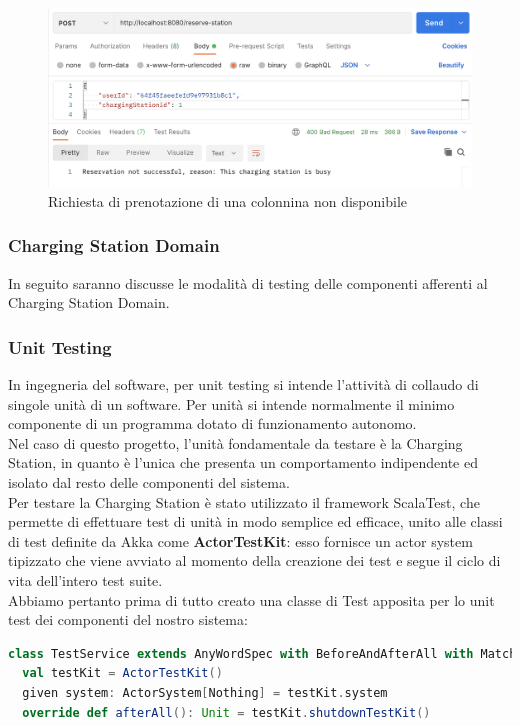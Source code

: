 \begin{figure}[htbp]
    \centering
    \includegraphics[width=\textwidth]{images/reserveNotOk.png}
    \caption{Richiesta di prenotazione di una colonnina non disponibile}
    \label{fig:reserveNotOk}
\end{figure}

\subsubsection{Charging Station Domain}
In seguito saranno discusse le modalità di testing delle componenti afferenti al Charging Station Domain.\\

\subsubsection{Unit Testing}
In ingegneria del software, per unit testing si intende l'attività di collaudo di singole unità di un software. Per unità si intende normalmente il minimo componente di un programma dotato di funzionamento autonomo.\\
Nel caso di questo progetto, l'unità fondamentale da testare è la Charging Station, in quanto è l'unica che presenta un comportamento indipendente ed isolato dal resto delle componenti del sistema.\\
Per testare la Charging Station è stato utilizzato il framework ScalaTest, che permette di effettuare test di unità in modo semplice ed efficace, unito alle classi di test definite da Akka come \textbf{ActorTestKit}: esso fornisce
un actor system tipizzato che viene avviato al momento della creazione dei test e segue il ciclo di vita dell'intero test suite.\\

Abbiamo pertanto prima di tutto creato una classe di Test apposita per lo unit test dei componenti del nostro sistema:

\begin {lstlisting}[language=scala]
class TestService extends AnyWordSpec with BeforeAndAfterAll with Matchers:
  val testKit = ActorTestKit()
  given system: ActorSystem[Nothing] = testKit.system
  override def afterAll(): Unit = testKit.shutdownTestKit()
\end{lstlisting}

